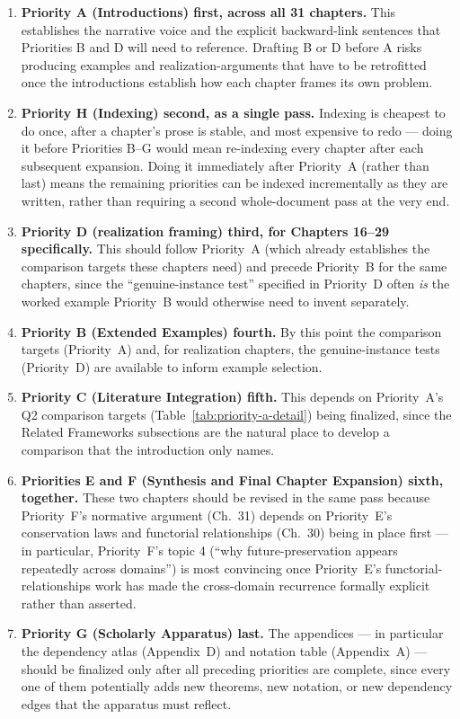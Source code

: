 \documentclass[11pt]{report}
\begin{document}
\begin{enumerate}
\item \textbf{Priority A (Introductions) first, across all 31
  chapters.} This establishes the narrative voice and the
  explicit backward-link sentences that Priorities B and D will
  need to reference. Drafting B or D before A risks producing
  examples and realization-arguments that have to be retrofitted
  once the introductions establish how each chapter frames its
  own problem.
\item \textbf{Priority H (Indexing) second, as a single pass.}
  Indexing is cheapest to do once, after a chapter's prose is
  stable, and most expensive to redo --- doing it before
  Priorities B--G would mean re-indexing every chapter after
  each subsequent expansion. Doing it immediately after Priority~A
  (rather than last) means the remaining priorities can be
  indexed incrementally as they are written, rather than requiring
  a second whole-document pass at the very end.
\item \textbf{Priority D (realization framing) third, for
  Chapters 16--29 specifically.} This should follow Priority~A
  (which already establishes the comparison targets these
  chapters need) and precede Priority~B for the same chapters,
  since the ``genuine-instance test'' specified in Priority~D
  often \emph{is} the worked example Priority~B would otherwise
  need to invent separately.
\item \textbf{Priority B (Extended Examples) fourth.} By this
  point the comparison targets (Priority~A) and, for realization
  chapters, the genuine-instance tests (Priority~D) are
  available to inform example selection.
\item \textbf{Priority C (Literature Integration) fifth.} This
  depends on Priority~A's Q2 comparison targets
  (Table~\ref{tab:priority-a-detail}) being finalized, since the
  Related Frameworks subsections are the natural place to
  develop a comparison that the introduction only names.
\item \textbf{Priorities E and F (Synthesis and Final Chapter
  Expansion) sixth, together.} These two chapters should be
  revised in the same pass because Priority~F's normative
  argument (Ch.~31) depends on Priority~E's conservation laws
  and functorial relationships (Ch.~30) being in place first ---
  in particular, Priority~F's topic 4 (``why future-preservation
  appears repeatedly across domains'') is most convincing once
  Priority~E's functorial-relationships work has made the
  cross-domain recurrence formally explicit rather than
  asserted.
\item \textbf{Priority G (Scholarly Apparatus) last.} The
  appendices --- in particular the dependency atlas (Appendix~D)
  and notation table (Appendix~A) --- should be finalized only
  after all preceding priorities are complete, since every one
  of them potentially adds new theorems, new notation, or new
  dependency edges that the apparatus must reflect.
\end{enumerate}
\end{document}
